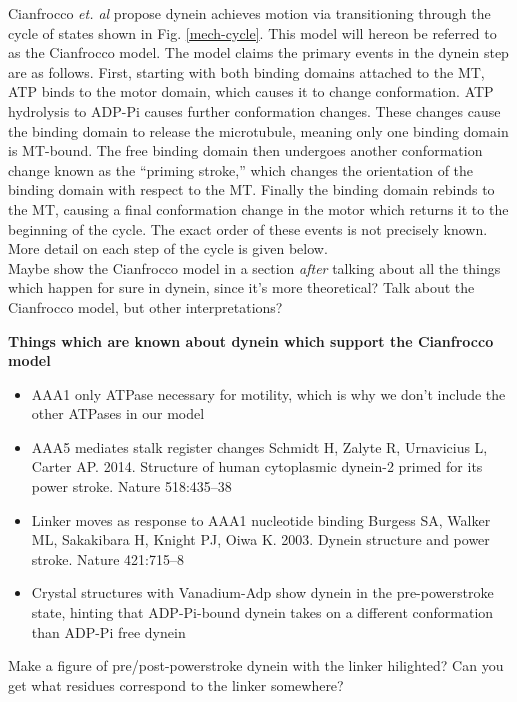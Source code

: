 \documentclass[10pt]{article} %
\begin{document}
Cianfrocco \textit{et. al} \cite{cianfroccoreview} propose dynein achieves motion via transitioning through the cycle of states shown in Fig. \ref{mech-cycle}. This model will hereon be referred to as the Cianfrocco model. The model claims the primary events in the dynein step are as follows. First, starting with both binding domains attached to the MT, ATP binds to the motor domain, which causes it to change conformation. ATP hydrolysis to ADP-Pi causes further conformation changes. These changes cause the binding domain to release the microtubule, meaning only one binding domain is MT-bound. The free binding domain then undergoes another conformation change known as the ``priming stroke,'' which changes the orientation of the binding domain with respect to the MT. Finally the binding domain rebinds to the MT, causing a final conformation change in the motor which returns it to the beginning of the cycle. The exact order of these events is not precisely known. More detail on each step of the cycle is given below.\\

Maybe show the Cianfrocco model in a section \textit{after} talking about all the things which happen for sure in dynein, since it's more theoretical? Talk about the Cianfrocco model, but other interpretations?

\textbf{Things which are known about dynein which support the Cianfrocco model}
\begin{itemize}
\item AAA1 only ATPase necessary for motility, which is why we don't include the other ATPases in our model \cite{cianfroccoreview}
\item AAA5 mediates stalk register changes Schmidt H, Zalyte R, Urnavicius L, Carter AP. 2014. Structure of human cytoplasmic dynein-2 primed for
  its power stroke. Nature 518:435–38
\item Linker moves as response to AAA1 nucleotide binding Burgess SA, Walker ML, Sakakibara H, Knight PJ, Oiwa K. 2003. Dynein structure and power stroke. Nature
  421:715–8
\item Crystal structures with Vanadium-Adp show dynein in the pre-powerstroke state, hinting that ADP-Pi-bound dynein takes on a different conformation than ADP-Pi free dynein
\end{itemize}

Make a figure of pre/post-powerstroke dynein with the linker hilighted? Can you get what residues correspond to the linker somewhere?
\end{document}
